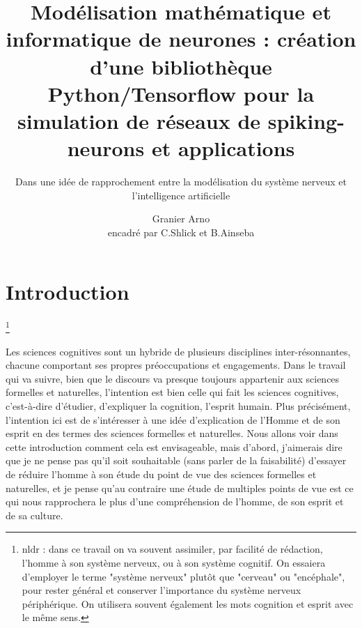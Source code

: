 \documentclass[12pt]{scrartcl}
\title{Modélisation mathématique et informatique de neurones : création d'une bibliothèque Python/Tensorflow pour la simulation de réseaux de spiking-neurons et applications }
\subtitle{Dans une idée de rapprochement entre la modélisation du système nerveux et l'intelligence artificielle}
\author{Granier Arno \\ encadré par C.Shlick et B.Ainseba}
\newcommand\blfootnote[1]{%
  \begingroup
  \renewcommand\thefootnote{}\footnote{#1}%
  \addtocounter{footnote}{-1}%
  \endgroup
}
\begin{document}
\maketitle

\tableofcontents

\pagebreak


\part{Introduction}
\blfootnote{nldr : dans ce travail on va souvent assimiler, par facilité de rédaction, l'homme à son système nerveux, ou à son système cognitif. On essaiera d'employer le terme "système nerveux" plutôt que "cerveau" ou "encéphale", pour rester général et conserver l'importance du système nerveux périphérique. On utilisera souvent également les mots cognition et esprit avec le même sens.}

Les sciences cognitives sont un hybride de plusieurs disciplines inter-résonnantes, chacune comportant ses propres préoccupations et engagements. Dans le travail qui va suivre, bien que le discours va presque toujours appartenir aux sciences formelles et naturelles, l'intention est bien celle qui fait les sciences cognitives, c'est-à-dire d'étudier, d'expliquer la cognition, l'esprit humain. Plus précisément, l'intention ici est de s'intéresser à une idée d'explication de l'Homme et de son esprit en des termes des sciences formelles et naturelles. Nous allons voir dans cette introduction comment cela est envisageable, mais d'abord, j'aimerais dire que je ne pense pas qu'il soit souhaitable (sans parler de la faisabilité) d'essayer de réduire l'homme à son étude du point de vue des sciences formelles et naturelles, et je pense qu'au contraire une étude de multiples points de vue est ce qui nous rapprochera le plus d'une compréhension de l'homme, de son esprit et de sa culture.\\
\end{document}
